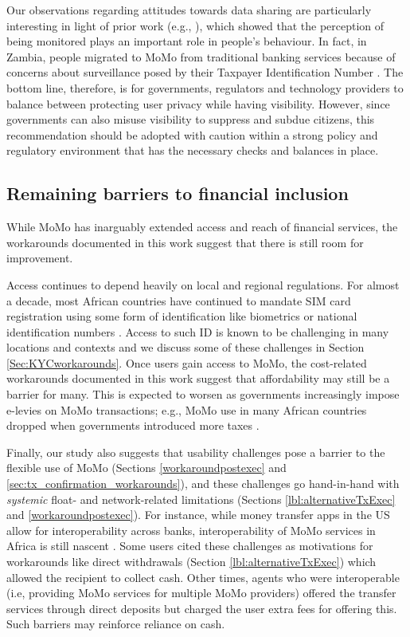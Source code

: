 Our observations regarding attitudes towards data sharing are particularly interesting in light of prior work (e.g., \cite{martin2019mobile,acquisti2015privacy}), which showed that the perception of being monitored plays an important role in people's behaviour. 
In fact, in Zambia, people migrated to MoMo from traditional banking services because of concerns about surveillance posed by their Taxpayer Identification Number \cite{phiri_2018}.  The bottom line, therefore, is for governments, regulators and technology providers to balance between protecting user privacy while having visibility. However, since governments can also misuse visibility to suppress and subdue citizens, this recommendation should be adopted with caution within a strong policy and regulatory environment that has the necessary checks and balances in place. 

\subsection {Remaining barriers to financial inclusion}
While MoMo has inarguably extended access and reach of financial services, 
the workarounds documented in this work suggest that there is still room for improvement.

Access continues to depend heavily on local and regional regulations. For almost a decade, most African countries have continued to mandate SIM card registration using some form of identification like biometrics or national identification numbers \cite{privacyinternational_2019} \cite{jentzsch2012implications} \cite{donovan2014therise}. Access to such ID is known to be challenging in many locations and contexts \cite{gsmmobile} \cite{clark2022id4d} \cite{demirgucc2022global} and we discuss some of these challenges in Section \ref{Sec:KYCworkarounds}. Once users gain access to MoMo, the cost-related workarounds documented in this work suggest that affordability may still be a barrier for many. 
This is expected to worsen as governments increasingly impose e-levies on MoMo transactions; 
e.g., MoMo use in many African countries dropped when  governments introduced more taxes \cite{clifford2020causes}. 

Finally, our study also suggests that usability challenges pose a barrier to the flexible  use of MoMo (Sections \ref{workaroundpostexec} and \ref{sec:tx_confirmation_workarounds}), and these challenges go hand-in-hand with  \emph{systemic} float- and network-related limitations (Sections \ref{lbl:alternativeTxExec} and \ref{workaroundpostexec}). 
For instance, while money transfer apps in the US allow for interoperability across banks, interoperability of MoMo services in Africa is still nascent \cite{naji2020tracking}. Some users cited these challenges as motivations for workarounds like direct withdrawals (Section \ref{lbl:alternativeTxExec}) which allowed the recipient to collect cash. Other times, agents who were interoperable (i.e, providing MoMo services for multiple MoMo providers) offered the transfer services through direct deposits but charged the user extra fees for offering this. Such barriers may reinforce reliance on cash. 

